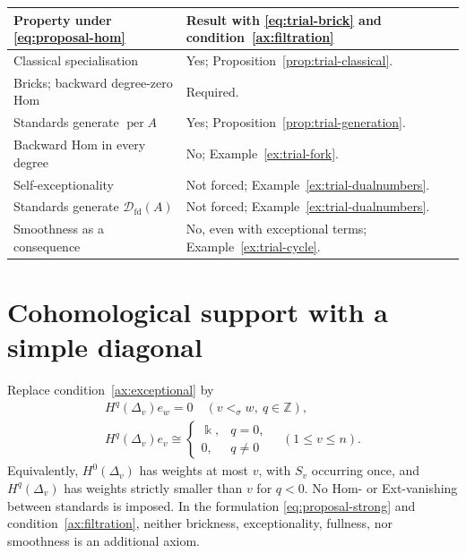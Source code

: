 \documentclass[11pt,a4paper]{article}
\newcommand{\D}{\mathcal D}
\newcommand{\ZZ}{\mathbb{Z}}
\newcommand{\std}{\Delta}
\DeclareMathOperator{\fd}{fd}
\DeclareMathOperator{\per}{per}
\theoremstyle{plain}
\theoremstyle{definition}
\numberwithin{equation}{section}
\begin{document}
\begin{center}\small
\begin{tabularx}{\linewidth}{@{}>{\raggedright\arraybackslash}p{.36\linewidth}>{\raggedright\arraybackslash}X@{}}
\toprule
Property under \eqref{eq:proposal-hom} & Result with
\eqref{eq:trial-brick} and condition~\ref{ax:filtration} \\\midrule
Classical specialisation & Yes; Proposition~\ref{prop:trial-classical}.\\
Bricks; backward degree-zero Hom & Required.\\
Standards generate $\per A$ & Yes; Proposition~\ref{prop:trial-generation}.\\
Backward Hom in every degree & No; Example~\ref{ex:trial-fork}.\\
Self-exceptionality & Not forced; Example~\ref{ex:trial-dualnumbers}.\\
Standards generate $\D_{\fd}(A)$ & Not forced; Example~\ref{ex:trial-dualnumbers}.\\
Smoothness as a consequence & No, even with exceptional terms;
Example~\ref{ex:trial-cycle}.\\
\bottomrule
\end{tabularx}
\end{center}

\section{Cohomological support with a simple diagonal}
\label{sec:proposal-strong}

Replace condition~\ref{ax:exceptional} by
\begin{equation*}\tag{C}\label{eq:proposal-strong}
 \begin{gathered}
 H^q(\std_v)e_w=0\quad(v<_\sigma w,\ q\in\ZZ),\\
 H^q(\std_v)e_v\cong
 \begin{cases}\Bbbk,&q=0,\\0,&q\neq0\end{cases}
 \quad(1\leq v\leq n).
 \end{gathered}
\end{equation*}
Equivalently, $H^0(\std_v)$ has weights at most $v$, with $S_v$
occurring once, and $H^q(\std_v)$ has weights strictly smaller than
$v$ for $q<0$. No Hom- or Ext-vanishing between standards is imposed.
In the formulation \eqref{eq:proposal-strong} and
condition~\ref{ax:filtration}, neither brickness, exceptionality,
fullness, nor smoothness is an additional axiom.
\end{document}
